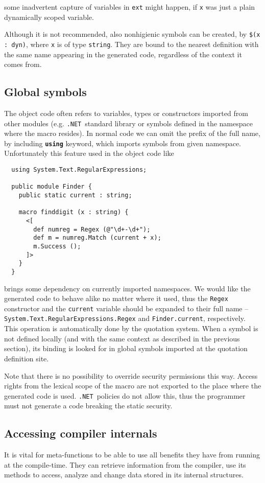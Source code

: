 \documentclass{llncs}
\newcommand{\net}[0]{{\tt .NET}}
\newcommand{\kw}[1]{{\tt \bf #1}}
\begin{document}
\noindent
some inadvertent capture of variables in \verb,ext, might happen, if 
\verb,x, was just a plain dynamically scoped variable.

Although it is not recommended, also nonhigienic symbols can be created, by
\verb,$(x : dyn),, where \verb,x, is of type \verb,string,. %
They are bound to the nearest definition with the same name appearing in the
generated code, regardless of the context it comes from.

\subsection{Global symbols}
The object code often refers to variables, types or constructors imported
from other modules (e.g. \net\ standard library or symbols defined in 
the namespace where the macro resides). In normal code we can omit the prefix 
of the full name, by including \kw{using} keyword, which imports symbols from
given namespace. Unfortunately this feature used in the object code like

\begin{verbatim}
  using System.Text.RegularExpressions;

  public module Finder {
    public static current : string;

    macro finddigit (x : string) {
      <[ 
        def numreg = Regex (@"\d+-\d+");
        def m = numreg.Match (current + x);
        m.Success ();
      ]>
    }
  }
\end{verbatim} %

\noindent
brings some dependency on currently imported namespaces. We would like the
generated code to behave alike no matter where it used, thus the
\verb,Regex, constructor and the \verb,current, variable should be expanded to
their full name -- \verb,System.Text.RegularExpressions.Regex,
and \verb,Finder.current,, respectively. This operation is automatically
done by the quotation system. When a symbol is not defined locally (and with 
the same context as described in the previous section), its binding is 
looked for in global symbols imported at the quotation definition site.

Note that there is no possibility to override security permissions this
way. Access rights from the lexical scope of the macro are not exported to 
the place where the generated code is used. \net\ policies do not allow this, 
thus the programmer must not generate a code breaking the static security.

\subsection{Accessing compiler internals}
It is vital for meta-functions to be able to use all benefits they have
from running at the compile-time. They can retrieve information from the
compiler, use its methods to access, analyze and change data stored
in its internal structures. 
\end{document}
